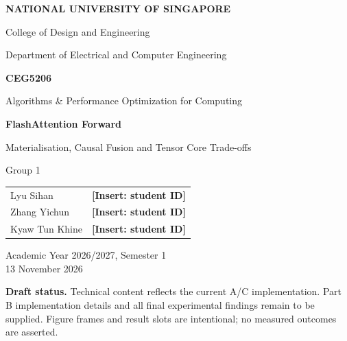 \documentclass[11pt,a4paper]{article}
\newcommand{\pending}[1]{\textcolor{draftblue}{\textbf{[Insert: #1]}}}
\begin{document}
\begin{titlepage}
\centering
\vspace*{14mm}
{\Large\bfseries NATIONAL UNIVERSITY OF SINGAPORE\par}
\vspace{4mm}
{\large College of Design and Engineering\par}
{\large Department of Electrical and Computer Engineering\par}
\vspace{15mm}
{\Large\bfseries CEG5206\par}
{\large Algorithms \& Performance Optimization for Computing\par}
\vspace{14mm}
{\LARGE\bfseries FlashAttention Forward\par}
\vspace{4mm}
{\large Materialisation, Causal Fusion and Tensor Core Trade-offs\par}
\vspace{14mm}
{\large Group 1\par}
\vspace{5mm}
\begin{tabular}{ll}
Lyu Sihan & \pending{student ID}\\[3pt]
Zhang Yichun & \pending{student ID}\\[3pt]
Kyaw Tun Khine & \pending{student ID}
\end{tabular}
\vfill
Academic Year 2026/2027, Semester 1\\
13 November 2026
\vspace{8mm}

\small\textbf{Draft status.} Technical content reflects the current A/C implementation.
Part B implementation details and all final experimental findings remain to be supplied.
Figure frames and result slots are intentional; no measured outcomes are asserted.
\end{titlepage}
\end{document}
